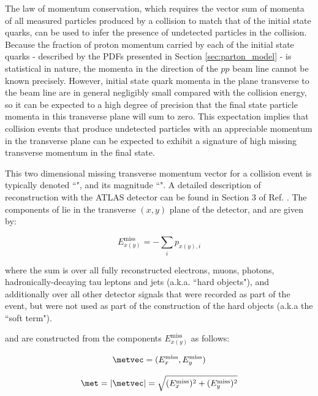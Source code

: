 The law of momentum conservation, which requires the vector sum of momenta of all measured particles produced by a collision to match that of the initial state quarks, can be used to infer the presence of undetected particles in the collision. Because the fraction of proton momentum carried by each of the initial state quarks - described by the PDFs presented in Section \ref{sec:parton_model} - is statistical in nature, the momenta in the direction of the \(pp\) beam line cannot be known precisely. However, initial state quark momenta in the plane transverse to the beam line are in general negligibly small compared with the collision energy, so it can be expected to a high degree of precision that the final state particle momenta in this transverse plane will sum to zero. This expectation implies that collision events that produce undetected particles with an appreciable momentum in the transverse plane can be expected to exhibit a signature of high missing transverse momentum in the final state. 

This two dimensional missing transverse momentum vector for a collision event is typically denoted ``\metvec", and its magnitude ``\met". A detailed description of \met reconstruction with the ATLAS detector can be found in Section 3 of Ref. \cite{met_reconstruction}. The components  of \metvec lie in the transverse \((x, y)\) plane of the detector, and are given by:

\begin{equation}
\label{eq:met_components}
E_{x(y)}^\text{miss} = -\sum_i p_{x(y), i}
\end{equation}

\noindent where the sum is over all fully reconstructed electrons, muons, photons, hadronically-decaying tau leptons and jets (a.k.a. ``hard objects"), and additionally over all other detector signals that were recorded as part of the event, but were not used as part of the construction of the hard objects (a.k.a the ``soft term").

\noindent \metvec and \met are constructed from the components \(E^\text{miss}_{x(y)}\) as follows:

\begin{equation}
\label{eq:met_vec}
\metvec = (E^\text{miss}_{x}, E^\text{miss}_{y})
\end{equation}

\begin{equation}
\label{eq:met_mag}
\met = |\metvec| = \sqrt{(E^\text{miss}_{x})^2 + (E^\text{miss}_{y})^2}
\end{equation}

